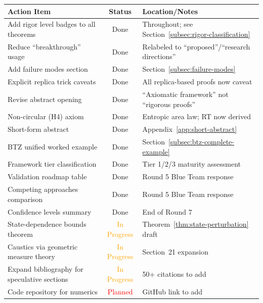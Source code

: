 \documentclass[12pt,a4paper]{article}
\begin{document}
\begin{center}
\renewcommand{\arraystretch}{1.3}
\begin{tabular}{|p{5cm}|c|p{6cm}|}
\hline
\textbf{Action Item} & \textbf{Status} & \textbf{Location/Notes} \\
\hline
Add rigor level badges to all theorems & \textcolor{green!50!black}{Done} & Throughout; see Section~\ref{subsec:rigor-classification} \\
\hline
Reduce ``breakthrough'' usage & \textcolor{green!50!black}{Done} & Relabeled to ``proposed''/``research directions'' \\
\hline
Add failure modes section & \textcolor{green!50!black}{Done} & Section~\ref{subsec:failure-modes} \\
\hline
Explicit replica trick caveats & \textcolor{green!50!black}{Done} & All replica-based proofs now caveat \\
\hline
Revise abstract opening & \textcolor{green!50!black}{Done} & ``Axiomatic framework'' not ``rigorous proofs'' \\
\hline
Non-circular (H4) axiom & \textcolor{green!50!black}{Done} & Entropic area law; RT now derived \\
\hline
Short-form abstract & \textcolor{green!50!black}{Done} & Appendix~\ref{app:short-abstract} \\
\hline
BTZ unified worked example & \textcolor{green!50!black}{Done} & Section~\ref{subsec:btz-complete-example} \\
\hline
Framework tier classification & \textcolor{green!50!black}{Done} & Tier 1/2/3 maturity assessment \\
\hline
Validation roadmap table & \textcolor{green!50!black}{Done} & Round 5 Blue Team response \\
\hline
Competing approaches comparison & \textcolor{green!50!black}{Done} & Round 5 Blue Team response \\
\hline
Confidence levels summary & \textcolor{green!50!black}{Done} & End of Round 7 \\
\hline
State-dependence bounds theorem & \textcolor{orange}{In Progress} & Theorem~\ref{thm:state-perturbation} draft \\
\hline
Caustics via geometric measure theory & \textcolor{orange}{In Progress} & Section~21 expansion \\
\hline
Expand bibliography for speculative sections & \textcolor{orange}{In Progress} & 50+ citations to add \\
\hline
Code repository for numerics & \textcolor{red}{Planned} & GitHub link to add \\
\hline
\end{tabular}
\end{center}
\end{document}
